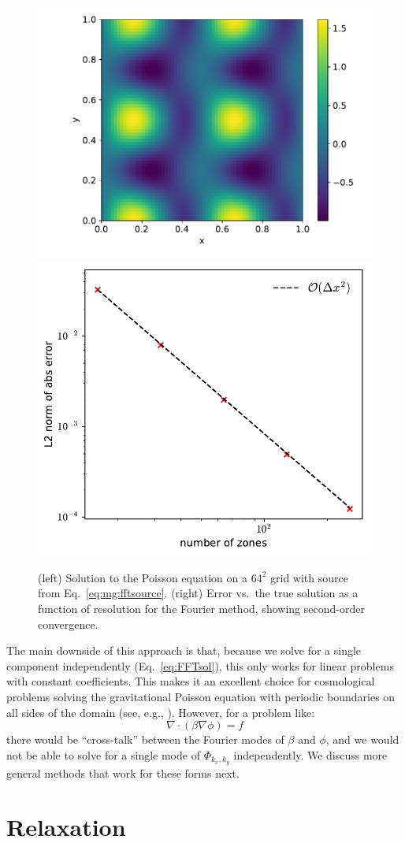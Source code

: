 \begin{figure}[t]
\centering
\includegraphics[width=0.53\linewidth]{poisson_fft}
\includegraphics[width=0.44\linewidth]{fft-poisson-converge}
\caption[FFT solution to the Poisson
  equation]{\label{fig:mg:fftpoisson} (left) Solution to the Poisson
  equation on a $64^2$ grid with source from
  Eq.~\ref{eq:mg:fftsource}. (right) Error vs.\ the true solution as a
  function of resolution for the Fourier method, showing second-order
  convergence.
  }
\end{figure}


The main downside of this approach is that, because we solve for a
single component independently (Eq.~\ref{eq:FFTsol}), this only works
for linear problems with constant coefficients.  This makes it an
excellent choice for cosmological problems solving the gravitational
Poisson equation with periodic boundaries on all sides of the domain
(see, e.g., \cite{heitmann:2008}).  However, for a problem like:
\begin{equation}
  \nabla \cdot (\beta \nabla \phi) = f
\end{equation}
there would be ``cross-talk'' between the Fourier modes of $\beta$ and
$\phi$, and we would not be able to solve for a single mode of
$\Phi_{k_x,k_y}$ independently.  We discuss more general methods that
work for these forms next.


\section{Relaxation}

